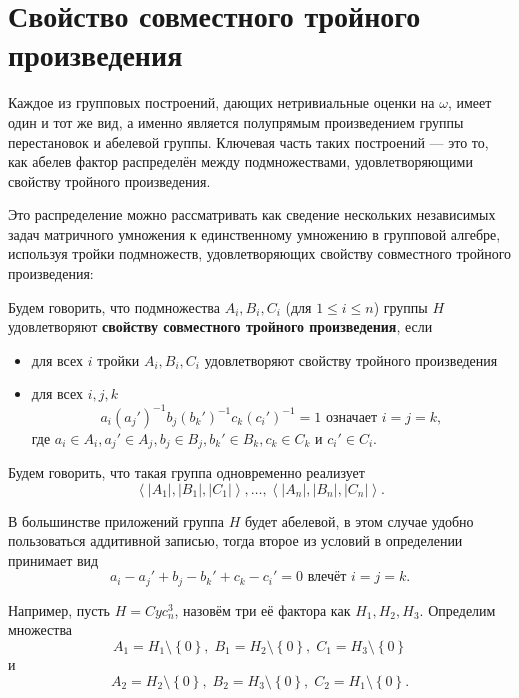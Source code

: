 \section{Свойство совместного тройного произведения}

Каждое из групповых построений, дающих нетривиальные оценки на $\omega$, имеет один и тот же вид, а именно является полупрямым произведением группы перестановок и абелевой группы. Ключевая часть таких построений --- это то, как абелев фактор распределён между подмножествами, удовлетворяющими свойству тройного произведения.

Это распределение можно рассматривать как сведение нескольких независимых задач матричного умножения к единственному умножению в групповой алгебре, используя тройки подмножеств, удовлетворяющих свойству совместного тройного произведения:

\begin{definition}\label{def:05:5.1}
  Будем говорить, что подмножества $A_i, B_i, C_i$ (для $1 \leq i \leq n$) группы $H$ удовлетворяют \textbf{свойству совместного тройного произведения}, если
  \begin{itemize}
    \item для всех $i$ тройки $A_i, B_i, C_i$ удовлетворяют свойству тройного произведения 
    \item для всех $i,j,k$ 
    \[
    	a_i (a_j')^{-1} b_j (b_k')^{-1} c_k (c_i')^{-1} = 1 \text{ означает } i=j=k,
    \]
    где $a_i \in A_i, a_j' \in A_j, b_j \in B_j, b_k' \in B_k, c_k \in C_k$ и $c_i' \in C_i$.
  \end{itemize}  
\end{definition}
Будем говорить, что такая группа одновременно реализует 
\[
	\left\langle |A_1|, |B_1|,|C_1| \right\rangle, \dotsc, \left\langle |A_n|, |B_n|,|C_n| \right\rangle.
\]

В большинстве приложений группа $H$ будет абелевой, в этом случае удобно пользоваться аддитивной записью, тогда второе из условий в определении принимает вид
\[
	a_i-a_j'+b_j-b_k'+c_k-c_i'=0 \text{ влечёт } i=j=k.
\]

Например, пусть $H=Cyc_n^3$, назовём три её фактора как $H_1, H_2, H_3$. Определим множества
\[
	A_1=H_1 \setminus \left\{ 0 \right\},\; B_1=H_2 \setminus \left\{ 0 \right\}, \; C_1=H_3 \setminus \left\{ 0 \right\}
\]
и
\[
	A_2=H_2 \setminus \left\{ 0 \right\},\; B_2=H_3 \setminus \left\{ 0 \right\}, \; C_2=H_1 \setminus \left\{ 0 \right\}.
\]

